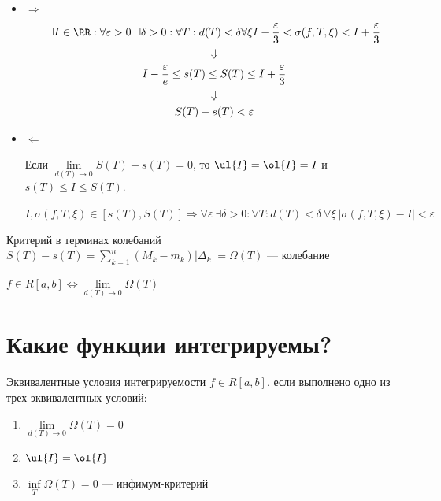 \begin{itemize}
    \item
        \( \Rightarrow \)
        \begin{gather*}
            \exists I \in \RR : \forall \varepsilon > 0 \ \exists \delta > 0 : \forall T : d(T) < \delta
            \forall \xi I - \frac{\varepsilon}{3} < \sigma(f, T, \xi) < I + \frac{\varepsilon}{3}
            \\
            \Downarrow
            \\
            I - \frac{\varepsilon}{e} \leq s(T) \leq S(T) \leq I + \frac{\varepsilon}{3}
            \\
            \Downarrow
            \\
            S(T) - s(T) < \varepsilon
        \end{gather*}
    \item
        \( \Leftarrow \)

        Если \( \lim\limits_{d(T) \to 0} S(T) - s(T) = 0 \), то \( \ul{I} = \ol{I} = I \) и \( s(T) \leq I \leq S(T) \).

        \(
            I, \sigma(f, T, \xi) \in [s(T), S(T)]
            \Rightarrow
            \forall \varepsilon \ \exists \delta > 0 : \forall T : d(T) < \delta \ \forall \xi \ |\sigma(f, T, \xi) - I| < \varepsilon
        \)
\end{itemize}

\begin{thrm}{Критерий в терминах колебаний}{}
    \( S(T) - s(T) = \sum\limits_{k = 1}^{n} (M_k - m_k) | \Delta_k | = \Omega(T) \) --- колебание

    \( f \in R[a, b] \Leftrightarrow \lim\limits_{d(T) \to 0} \Omega(T) \)
\end{thrm}

\section{Какие функции интегрируемы?}

\begin{thrm}{Эквивалентные условия интегрируемости}{}
    \( f \in R[a, b] \), если выполнено одно из трех эквивалентных условий:
    \begin{enumerate}
        \item
            \( \lim\limits_{d(T) \to 0} \Omega(T) = 0 \)
        \item
            \( \ul{I} = \ol{I} \)
        \item
            \( \inf\limits_T \Omega(T) = 0 \) --- инфимум-критерий
    \end{enumerate}
\end{thrm}

